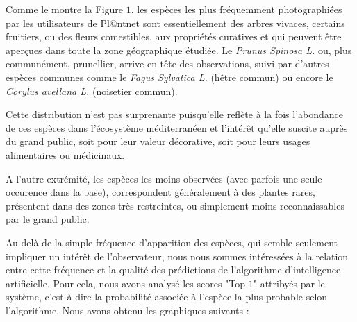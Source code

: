 \documentclass[a4paper,12pt]{article}
\begin{document}

Comme le montre la Figure $1$, les espèces les plus fréquemment photographiées par les utilisateurs de Pl@ntnet sont essentiellement des arbres vivaces, certains fruitiers, ou des fleurs comestibles, aux propriétés curatives et qui peuvent être aperçues dans toute la zone géographique étudiée. Le \textit{Prunus Spinosa L.} ou, plus communément, prunellier, arrive en tête des observations, suivi par d'autres espèces communes comme le \textit{Fagus Sylvatica L.} (hêtre commun) ou encore le \textit{Corylus avellana L.} (noisetier commun).

\vspace{0.2cm}

Cette distribution n'est pas surprenante puisqu'elle reflète à la fois l'abondance de ces espèces dans l'écosystème méditerranéen et l'intérêt qu'elle suscite auprès du grand public, soit pour leur valeur décorative, soit pour leurs usages alimentaires ou médicinaux.

\vspace{0.2cm}

A l'autre extrémité, les espèces les moins observées (avec parfois une seule occurence dans la base), correspondent généralement à des plantes rares, présentent dans des zones très restreintes, ou simplement moins reconnaissables par le grand public.

\vspace{0.2cm}

Au-delà de la simple fréquence d'apparition des espèces, qui semble seulement impliquer un intérêt de l'observateur, nous nous sommes intéressées à la relation entre cette fréquence et la qualité des prédictions de l'algorithme d'intelligence artificielle. Pour cela, nous avons analysé les scores "Top $1$" attribyés par le système, c'est-à-dire la probabilité associée à l'espèce la plus probable selon l'algorithme. Nous avons obtenu les graphiques suivants :
\end{document}
